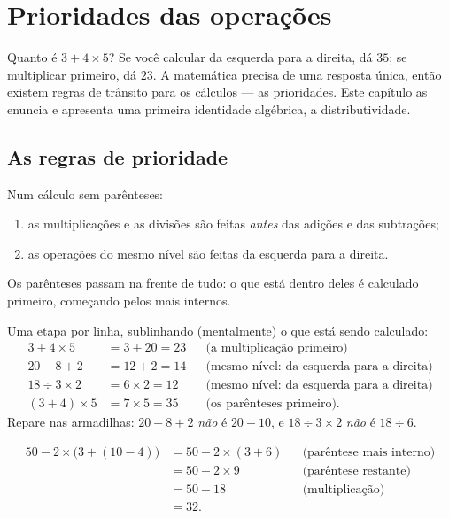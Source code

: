 \chapter{Prioridades das operações}\label{ch:g7:priorities}

Quanto é $3 + 4 \times 5$? Se você calcular da esquerda para a direita,
dá $35$; se multiplicar primeiro, dá $23$. A matemática precisa de uma
resposta única, então existem regras de trânsito para os cálculos ---
as prioridades. Este capítulo as enuncia e apresenta uma primeira
identidade algébrica, a distributividade.

\section{As regras de prioridade}

\begin{theorem}\label{thm:g7:priorities:rules}
Num cálculo sem parênteses:
\begin{enumerate}
  \item as multiplicações e as divisões são feitas \emph{antes} das
        adições e das subtrações;
  \item as operações do mesmo nível são feitas da esquerda para a
        direita.
\end{enumerate}
Os parênteses passam na frente de tudo: o que está dentro deles é
calculado primeiro, começando pelos mais internos.
\end{theorem}

\begin{example}\label{ex:g7:priorities:basic}
Uma etapa por linha, sublinhando (mentalmente) o que está sendo
calculado:
\begin{align*}
3 + 4 \times 5 &= 3 + 20 = 23
&&\text{(a multiplicação primeiro)}\\
20 - 8 + 2 &= 12 + 2 = 14
&&\text{(mesmo nível: da esquerda para a direita)}\\
18 \div 3 \times 2 &= 6 \times 2 = 12
&&\text{(mesmo nível: da esquerda para a direita)}\\
(3 + 4) \times 5 &= 7 \times 5 = 35
&&\text{(os parênteses primeiro).}
\end{align*}
Repare nas armadilhas: $20 - 8 + 2$ \emph{não} é $20 - 10$, e
$18 \div 3 \times 2$ \emph{não} é $18 \div 6$.
\end{example}

\begin{example}\label{ex:g7:priorities:nested}
\begin{align*}
50 - 2 \times \bigl(3 + (10 - 4)\bigr)
&= 50 - 2 \times (3 + 6) && \text{(parêntese mais interno)}\\
&= 50 - 2 \times 9 && \text{(parêntese restante)}\\
&= 50 - 18 && \text{(multiplicação)}\\
&= 32 .
\end{align*}
\end{example}

